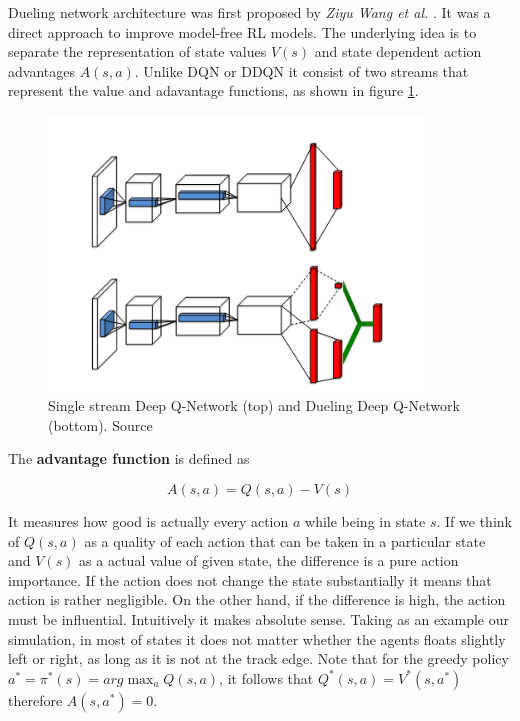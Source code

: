 Dueling network architecture was first proposed by \emph{Ziyu Wang  et al.} \cite{DBLP:journals/corr/WangFL15}. It was a direct approach to 
improve model-free RL models. The underlying idea is to separate the representation of state values $V(s)$ and state dependent action 
advantages $A(s, a)$. Unlike DQN or DDQN it consist of two streams that represent the value and adavantage functions, as shown in figure \ref{fig:single-vs-dueling-q-network}.

\begin{figure}[h]
    \centering
    \includegraphics[width=10cm]{img/dueling_vs_single_qn.png}
    \caption{Single stream Deep Q-Network (top) and Dueling Deep Q-Network (bottom). Source \cite{DBLP:journals/corr/WangFL15}}
    \label{fig:single-vs-dueling-q-network}
\end{figure}

The \textbf{advantage function} is defined as

\begin{equation}
    A(s, a) = Q(s, a) - V(s)
\label{eq:advantage}
\end{equation}

It measures how good is actually every action $a$ while being in state $s$. If we think of $Q(s, a)$ as a quality of each action that can be
taken in a particular state and $V(s)$ as a actual value of given state, the difference is a pure action importance. If the action does not 
change the state substantially it means that action is rather negligible. On the other hand, if the difference is high, the action must be
influential. Intuitively it makes absolute sense. Taking as an example our simulation, in most of states it does not matter whether the
agents floats slightly left or right, as long as it is not at the track edge. Note that for the greedy policy $a^* = \pi^*(s) =
arg\max_aQ(s, a)$, it follows that $Q^*(s, a) = V^*(s, a^*)$ therefore $A(s, a^*) = 0$.

